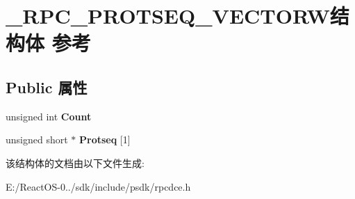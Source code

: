 \hypertarget{struct___r_p_c___p_r_o_t_s_e_q___v_e_c_t_o_r_w}{}\section{\+\_\+\+R\+P\+C\+\_\+\+P\+R\+O\+T\+S\+E\+Q\+\_\+\+V\+E\+C\+T\+O\+R\+W结构体 参考}
\label{struct___r_p_c___p_r_o_t_s_e_q___v_e_c_t_o_r_w}
\subsection*{Public 属性}
\begin{DoxyCompactItemize}
\item 
\mbox{\label{struct___r_p_c___p_r_o_t_s_e_q___v_e_c_t_o_r_w_a1cc0b5201c86a65c80d304d2f2dbeedc}} 
unsigned int {\bfseries Count}
\item 
\mbox{\label{struct___r_p_c___p_r_o_t_s_e_q___v_e_c_t_o_r_w_acb72490d92f9f4bea01fc97a22f5e640}} 
unsigned short $\ast$ {\bfseries Protseq} \mbox{[}1\mbox{]}
\end{DoxyCompactItemize}


该结构体的文档由以下文件生成\+:\begin{DoxyCompactItemize}
\item 
E\+:/\+React\+O\+S-\/0../sdk/include/psdk/rpcdce.\+h\end{DoxyCompactItemize}

